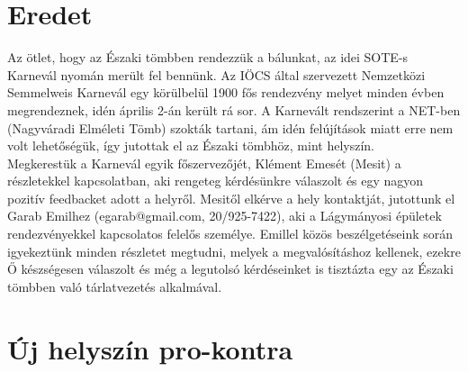 \section{Eredet}
\indent Az ötlet, hogy az Északi tömbben rendezzük a bálunkat, az idei SOTE-s Karnevál nyomán merült fel bennünk. Az IÖCS által szervezett Nemzetközi Semmelweis Karnevál egy körülbelül 1900 fős rendezvény melyet minden évben megrendeznek, idén április 2-án került rá sor. A Karnevált rendszerint a NET-ben (Nagyváradi Elméleti Tömb) szokták tartani, ám idén felújítások miatt erre nem volt lehetőségük, így jutottak el az Északi tömbhöz, mint helyszín.\\
\indent	Megkerestük a Karnevál egyik főszervezőjét, Klément Emesét (Mesit) a részletekkel kapcsolatban, aki rengeteg kérdésünkre válaszolt és egy nagyon pozitív feedbacket adott a helyről. Mesitől elkérve a hely kontaktját, jutottunk el Garab Emilhez (egarab@gmail.com, 20/925-7422), aki a Lágymányosi épületek rendezvényekkel kapcsolatos felelős személye. Emillel közös beszélgetéseink során igyekeztünk minden részletet megtudni, melyek a megvalósításhoz kellenek, ezekre Ő készségesen válaszolt és még a legutolsó kérdéseinket is tisztázta egy az Északi tömbben való tárlatvezetés alkalmával.

\section{Új helyszín pro-kontra}
